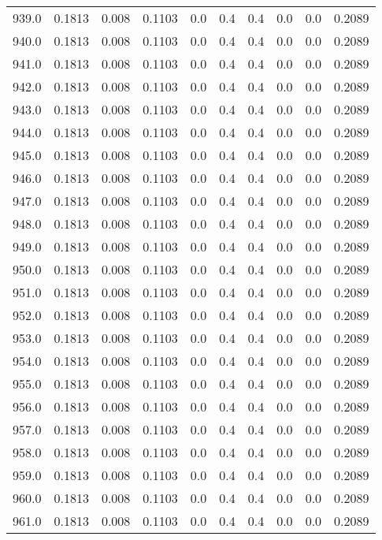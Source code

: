 \begin{longtable}{lrrrrrrrrr}
939.0 & 0.1813 & 0.008 & 0.1103 & 0.0 & 0.4 & 0.4 & 0.0 & 0.0 & 0.2089 \\
940.0 & 0.1813 & 0.008 & 0.1103 & 0.0 & 0.4 & 0.4 & 0.0 & 0.0 & 0.2089 \\
941.0 & 0.1813 & 0.008 & 0.1103 & 0.0 & 0.4 & 0.4 & 0.0 & 0.0 & 0.2089 \\
942.0 & 0.1813 & 0.008 & 0.1103 & 0.0 & 0.4 & 0.4 & 0.0 & 0.0 & 0.2089 \\
943.0 & 0.1813 & 0.008 & 0.1103 & 0.0 & 0.4 & 0.4 & 0.0 & 0.0 & 0.2089 \\
944.0 & 0.1813 & 0.008 & 0.1103 & 0.0 & 0.4 & 0.4 & 0.0 & 0.0 & 0.2089 \\
945.0 & 0.1813 & 0.008 & 0.1103 & 0.0 & 0.4 & 0.4 & 0.0 & 0.0 & 0.2089 \\
946.0 & 0.1813 & 0.008 & 0.1103 & 0.0 & 0.4 & 0.4 & 0.0 & 0.0 & 0.2089 \\
947.0 & 0.1813 & 0.008 & 0.1103 & 0.0 & 0.4 & 0.4 & 0.0 & 0.0 & 0.2089 \\
948.0 & 0.1813 & 0.008 & 0.1103 & 0.0 & 0.4 & 0.4 & 0.0 & 0.0 & 0.2089 \\
949.0 & 0.1813 & 0.008 & 0.1103 & 0.0 & 0.4 & 0.4 & 0.0 & 0.0 & 0.2089 \\
950.0 & 0.1813 & 0.008 & 0.1103 & 0.0 & 0.4 & 0.4 & 0.0 & 0.0 & 0.2089 \\
951.0 & 0.1813 & 0.008 & 0.1103 & 0.0 & 0.4 & 0.4 & 0.0 & 0.0 & 0.2089 \\
952.0 & 0.1813 & 0.008 & 0.1103 & 0.0 & 0.4 & 0.4 & 0.0 & 0.0 & 0.2089 \\
953.0 & 0.1813 & 0.008 & 0.1103 & 0.0 & 0.4 & 0.4 & 0.0 & 0.0 & 0.2089 \\
954.0 & 0.1813 & 0.008 & 0.1103 & 0.0 & 0.4 & 0.4 & 0.0 & 0.0 & 0.2089 \\
955.0 & 0.1813 & 0.008 & 0.1103 & 0.0 & 0.4 & 0.4 & 0.0 & 0.0 & 0.2089 \\
956.0 & 0.1813 & 0.008 & 0.1103 & 0.0 & 0.4 & 0.4 & 0.0 & 0.0 & 0.2089 \\
957.0 & 0.1813 & 0.008 & 0.1103 & 0.0 & 0.4 & 0.4 & 0.0 & 0.0 & 0.2089 \\
958.0 & 0.1813 & 0.008 & 0.1103 & 0.0 & 0.4 & 0.4 & 0.0 & 0.0 & 0.2089 \\
959.0 & 0.1813 & 0.008 & 0.1103 & 0.0 & 0.4 & 0.4 & 0.0 & 0.0 & 0.2089 \\
960.0 & 0.1813 & 0.008 & 0.1103 & 0.0 & 0.4 & 0.4 & 0.0 & 0.0 & 0.2089 \\
961.0 & 0.1813 & 0.008 & 0.1103 & 0.0 & 0.4 & 0.4 & 0.0 & 0.0 & 0.2089 \\

\end{longtable}
